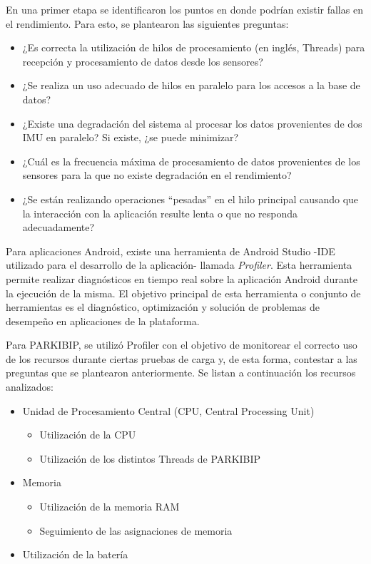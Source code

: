 En una primer etapa se identificaron los puntos en donde podrían existir fallas en el rendimiento. Para esto, se plantearon las siguientes preguntas:

\begin{itemize}
    \item ¿Es correcta la utilización de hilos de procesamiento (en inglés, Threads) para recepción y procesamiento de datos desde los sensores?
    \item ¿Se realiza un uso adecuado de hilos en paralelo para los accesos a la base de datos? 
    \item ¿Existe una degradación del sistema al procesar los datos provenientes de dos IMU en paralelo? Si existe, ¿se puede minimizar?
    \item ¿Cuál es la frecuencia máxima de procesamiento de datos provenientes de los sensores para la que no existe degradación en el rendimiento?
    \item ¿Se están realizando operaciones ``pesadas'' en el hilo principal causando que la interacción con la aplicación resulte lenta o que no responda adecuadamente? 
\end{itemize}


Para aplicaciones Android, existe una herramienta de Android Studio -\gls{IDE} utilizado para el desarrollo de la aplicación- llamada \textit{Profiler}. Esta herramienta permite realizar diagnósticos en tiempo real sobre la aplicación Android durante la ejecución de la misma. El objetivo principal de esta herramienta o conjunto de herramientas es el diagnóstico, optimización y solución de problemas de desempeño en aplicaciones de la plataforma. 

Para PARKIBIP, se utilizó Profiler con el objetivo de monitorear el correcto uso de los recursos durante ciertas pruebas de carga y, de esta forma, contestar a las preguntas que se plantearon anteriormente. Se listan a continuación los recursos analizados:

\begin{itemize}
    \item Unidad de Procesamiento Central (CPU, Central Processing Unit)
    \begin{itemize}
        \item Utilización de la CPU 
        \item Utilización de los distintos Threads de PARKIBIP
    \end{itemize}
    \item Memoria 
    \begin{itemize}
        \item Utilización de la memoria RAM 
        \item Seguimiento de las asignaciones de memoria 
    \end{itemize}
    \item Utilización de la batería 
\end{itemize}


